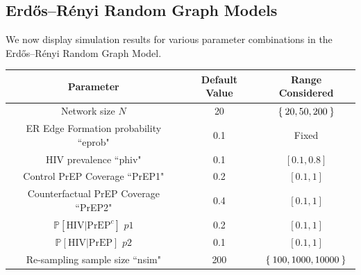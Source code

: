 \documentclass{article}
\theoremstyle{definition}
\begin{document}
\subsection{Erdős–Rényi  Random Graph Models}
We now display simulation results for various parameter combinations in the Erdős–Rényi Random Graph Model.
\begin{center}
    \begin{tabular}{|c|c|c|}
    \hline
         Parameter & Default Value & Range Considered  \\
         \hline
         Network size $N$& 20 & $\Set{20,50,200}$\\
         \hline
         ER Edge Formation probability ``eprob" & 0.1 & Fixed \\
         \hline
         HIV prevalence ``phiv" & 0.1 & $[0.1,0.8]$\\
         \hline
         Control PrEP Coverage ``PrEP1" & 0.2 & $[0.1,1]$\\
         \hline
         Counterfactual PrEP Coverage ``PrEP2" & 0.4 & $[0.1,1]$\\
         \hline
         $\mathbb{P}\left[\text{HIV} \vert \text{PrEP}^{c}\right]$ $p1$ & 0.2 & $[0.1,1]$\\
         \hline
         $\mathbb{P}\left[\text{HIV} \vert \text{PrEP}\right]$ $p2$ & 0.1 & $[0.1,1]$\\
         \hline
         Re-sampling sample size ``nsim" & 200 & $\Set{100,1000,10000}$\\
         \hline
    \end{tabular}
\end{center}
\end{document}
